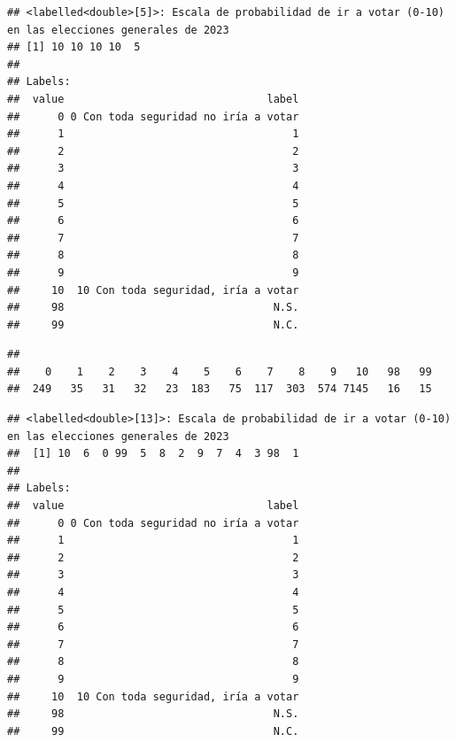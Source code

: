 \documentclass[
]{article}
\newenvironment{Shaded}{\begin{snugshade}}{\end{snugshade}}
\newcommand{\CommentTok}[1]{\textcolor[rgb]{0.56,0.35,0.01}{\textit{#1}}}
\newcommand{\FunctionTok}[1]{\textcolor[rgb]{0.13,0.29,0.53}{\textbf{#1}}}
\newcommand{\NormalTok}[1]{#1}
\newcommand{\SpecialCharTok}[1]{\textcolor[rgb]{0.81,0.36,0.00}{\textbf{#1}}}
\begin{document}
\begin{verbatim}
## <labelled<double>[5]>: Escala de probabilidad de ir a votar (0-10) en las elecciones generales de 2023
## [1] 10 10 10 10  5
## 
## Labels:
##  value                                label
##      0 0 Con toda seguridad no iría a votar
##      1                                    1
##      2                                    2
##      3                                    3
##      4                                    4
##      5                                    5
##      6                                    6
##      7                                    7
##      8                                    8
##      9                                    9
##     10  10 Con toda seguridad, iría a votar
##     98                                 N.S.
##     99                                 N.C.
\end{verbatim}

\begin{Shaded}
\end{Shaded}

\begin{verbatim}
## 
##    0    1    2    3    4    5    6    7    8    9   10   98   99 
##  249   35   31   32   23  183   75  117  303  574 7145   16   15
\end{verbatim}

\begin{Shaded}
\end{Shaded}

\begin{verbatim}
## <labelled<double>[13]>: Escala de probabilidad de ir a votar (0-10) en las elecciones generales de 2023
##  [1] 10  6  0 99  5  8  2  9  7  4  3 98  1
## 
## Labels:
##  value                                label
##      0 0 Con toda seguridad no iría a votar
##      1                                    1
##      2                                    2
##      3                                    3
##      4                                    4
##      5                                    5
##      6                                    6
##      7                                    7
##      8                                    8
##      9                                    9
##     10  10 Con toda seguridad, iría a votar
##     98                                 N.S.
##     99                                 N.C.
\end{verbatim}
\end{document}
